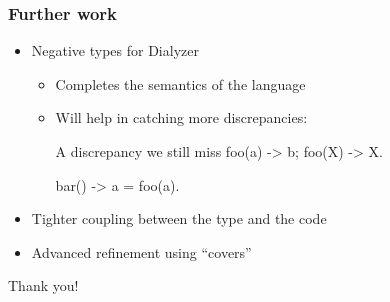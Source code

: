 \documentclass{beamer}
\begin{document}
\begin{frame}[fragile]
  \frametitle{Further work}
  \begin{itemize}
  \item Negative types for Dialyzer
    \begin{itemize}
    \item Completes the semantics of the language
    \item Will help in catching more discrepancies:
\begin{code}{A discrepancy we still miss}
foo(a) -> b;
foo(X) -> X.

bar() ->
    a = foo(a).
\end{code}
    \end{itemize} \pause
  \item Tighter coupling between the type and the code \pause
  \item Advanced refinement using ``covers''
  \end{itemize}
\end{frame}

\begin{frame}
  \begin{center}
    Thank you!
  \end{center}
\end{frame}
\end{document}
